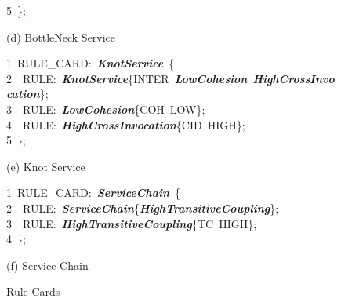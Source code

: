 \begin{figure}
\begin{small}
5~\};
\vspace{-0.2cm}
\begin{center}
(d) BottleNeck Service
\end{center}
\vspace{-0.2cm}
1~RULE\_CARD:~\emph{\textbf{KnotService}}~\{\\
2~~RULE:~\emph{\textbf{KnotService}}\{INTER~\emph{\textbf{LowCohesion}}~\emph{\textbf{HighCrossInvocation}}\};\\
3~~RULE:~\emph{\textbf{LowCohesion}}\{COH~LOW\};\\
4~~RULE:~\emph{\textbf{HighCrossInvocation}}\{CID~HIGH\};\\
5~\};
\vspace{-0.2cm}
\begin{center}
(e) Knot Service
\end{center}
\vspace{-0.2cm}
1~RULE\_CARD:~\emph{\textbf{ServiceChain}}~\{\\
2~~RULE:~\emph{\textbf{ServiceChain}}\{\emph{\textbf{HighTransitiveCoupling}}\};\\
3~~RULE:~\emph{\textbf{HighTransitiveCoupling}}\{TC~HIGH\};\\
4~\};
\vspace{-0.2cm}
\begin{center}
(f) Service Chain
\end{center}
\end{small}
\vspace{-0.2cm}
\caption{Rule Cards\label{fig:rules}}
\end{figure}

